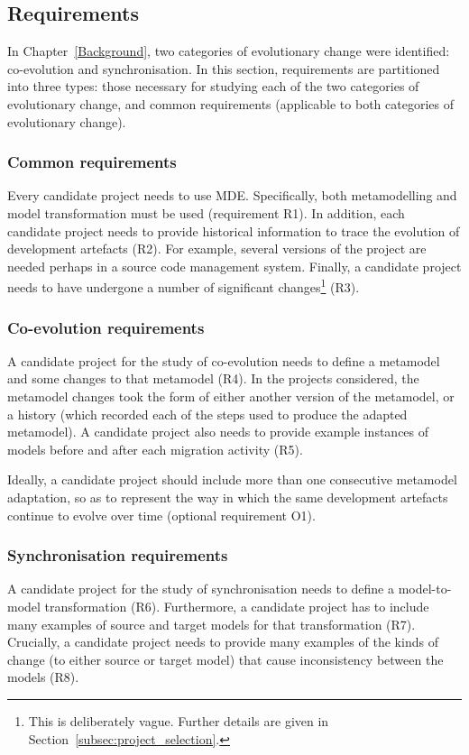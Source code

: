 \subsection{Requirements}
In Chapter~\ref{Background}, two categories of evolutionary change were identified: co-evolution and synchronisation. In this section, requirements are partitioned into three types: those necessary for studying each of the two categories of evolutionary change, and common requirements (applicable to both categories of evolutionary change).

\subsubsection{Common requirements}
Every candidate project needs to use MDE. Specifically, both metamodelling and model transformation must be used (requirement R1). In addition, each candidate project needs to provide historical information to trace the evolution of development artefacts (R2). For example, several versions of the project are needed perhaps in a source code management system. Finally, a candidate project needs to have undergone a number of significant changes\footnote{This is deliberately vague. Further details are given in Section~\ref{subsec:project_selection}.} (R3).

\subsubsection{Co-evolution requirements}
A candidate project for the study of co-evolution needs to define a metamodel and some changes to that metamodel (R4). In the projects considered, the metamodel changes took the form of either another version of the metamodel, or a history (which recorded each of the steps used to produce the adapted metamodel). A candidate project also needs to provide example instances of models before and after each migration activity (R5).

Ideally, a candidate project should include more than one consecutive metamodel adaptation, so as to represent the way in which the same development artefacts continue to evolve over time (optional requirement O1).

\subsubsection{Synchronisation requirements}
A candidate project for the study of synchronisation needs to define a model-to-model transformation (R6). Furthermore, a candidate project has to include many examples of source and target models for that transformation (R7). Crucially, a candidate project needs to provide many examples of the kinds of change (to either source or target model) that cause inconsistency between the models (R8). 

